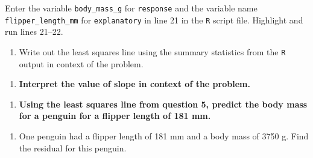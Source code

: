 \documentclass[
]{report}
\newenvironment{Shaded}{\begin{snugshade}}{\end{snugshade}}
\newcommand{\AttributeTok}[1]{\textcolor[rgb]{0.77,0.63,0.00}{#1}}
\newcommand{\CommentTok}[1]{\textcolor[rgb]{0.56,0.35,0.01}{\textit{#1}}}
\newcommand{\FunctionTok}[1]{\textcolor[rgb]{0.00,0.00,0.00}{#1}}
\newcommand{\NormalTok}[1]{#1}
\newcommand{\OtherTok}[1]{\textcolor[rgb]{0.56,0.35,0.01}{#1}}
\newcommand{\SpecialCharTok}[1]{\textcolor[rgb]{0.00,0.00,0.00}{#1}}
\providecommand{\tightlist}{%
  \setlength{\itemsep}{0pt}\setlength{\parskip}{0pt}}
\begin{document}
\vspace{1in}

Enter the variable \texttt{body\_mass\_g} for \texttt{response} and the variable name \texttt{flipper\_length\_mm} for \texttt{explanatory} in line 21 in the \texttt{R} script file. Highlight and run lines 21--22.

\begin{Shaded}
\end{Shaded}

\begin{enumerate}
\def\labelenumi{\arabic{enumi}.}
\setcounter{enumi}{4}
\tightlist
\item
  Write out the least squares line using the summary statistics from the \texttt{R} output in context of the problem.
\end{enumerate}

\vspace{.5in}

\begin{enumerate}
\def\labelenumi{\arabic{enumi}.}
\setcounter{enumi}{5}
\tightlist
\item
  \textbf{Interpret the value of slope in context of the problem.}
\end{enumerate}

\vspace{.8in}

\begin{enumerate}
\def\labelenumi{\arabic{enumi}.}
\setcounter{enumi}{6}
\tightlist
\item
  \textbf{Using the least squares line from question 5, predict the body mass for a penguin for a flipper length of 181 mm.}
\end{enumerate}

\vspace{.6in}

\begin{enumerate}
\def\labelenumi{\arabic{enumi}.}
\setcounter{enumi}{7}
\tightlist
\item
  One penguin had a flipper length of 181 mm and a body mass of 3750 g. Find the residual for this penguin.
\end{enumerate}
\end{document}
